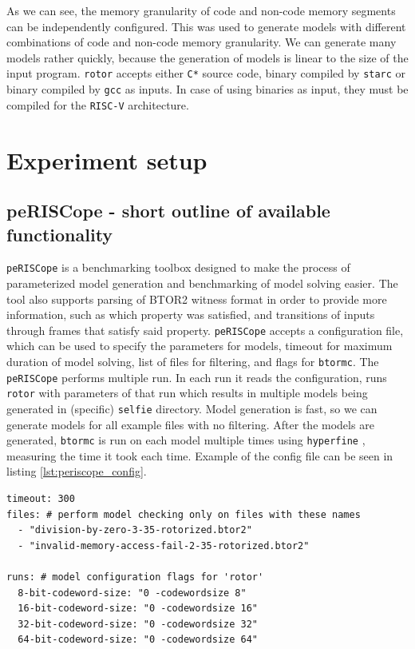 \documentclass[12pt]{article}
\begin{document}
As we can see, the memory granularity of code and non-code memory segments can
be independently configured. This was used to generate models with different
combinations of code and non-code memory granularity. We can generate many 
models rather quickly, because the generation of models is linear to the size
of the input program. \texttt{rotor} accepts either \texttt{C*} source code,
binary compiled by \texttt{starc} or binary compiled by \texttt{gcc} as inputs.
In case of using binaries as input, they must be compiled for the
\texttt{RISC-V} architecture.


\section{Experiment setup}

\subsection{peRISCope - short outline of available functionality}

\texttt{peRISCope} is a benchmarking toolbox designed to make the process of 
parameterized model generation and benchmarking of model solving easier. The 
tool also supports parsing of BTOR2 witness format in order to provide more 
information, such as which property was satisfied, and transitions of inputs
through frames that satisfy said property. \texttt{peRISCope} accepts a
configuration file, which can be used to specify the parameters for models,
timeout for maximum duration of model solving, list of files for filtering, and
flags for \texttt{btormc}. The \texttt{peRISCope} performs multiple run. In
each run it reads the configuration, runs \texttt{rotor} with parameters of
that run which results in multiple models being generated in (specific)
\texttt{selfie} directory. Model generation is fast, so we can generate models
for all example files with no filtering. After the models are generated,
\texttt{btormc} is run on each model multiple times using \texttt{hyperfine}
\cite{Peter_hyperfine_2023}, measuring the time it took each time. Example of
the config file can be seen in listing 
\ref{lst:periscope_config}.

\begin{lstlisting}[label=lst:periscope_config, caption={Example peRISCope configuration file}, captionpos=b]
timeout: 300
files: # perform model checking only on files with these names
  - "division-by-zero-3-35-rotorized.btor2"
  - "invalid-memory-access-fail-2-35-rotorized.btor2"

runs: # model configuration flags for 'rotor'
  8-bit-codeword-size: "0 -codewordsize 8"
  16-bit-codeword-size: "0 -codewordsize 16"
  32-bit-codeword-size: "0 -codewordsize 32"
  64-bit-codeword-size: "0 -codewordsize 64"

\end{lstlisting}
\end{document}
